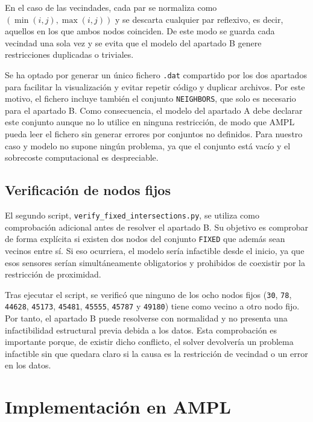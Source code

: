 \documentclass[12pt,a4paper]{article}
\begin{document}
En el caso de las vecindades, cada par se normaliza como \((\min(i,j), \max(i,j))\) y se descarta cualquier par reflexivo, es decir, aquellos en los que ambos nodos coinciden. De este modo se guarda cada vecindad una sola vez y se evita que el modelo del apartado B genere restricciones duplicadas o triviales.

Se ha optado por generar un único fichero \texttt{.dat} compartido por los dos apartados para facilitar la visualización y evitar repetir código y duplicar archivos. Por este motivo, el fichero incluye también el conjunto \texttt{NEIGHBORS}, que solo es necesario para el apartado B. Como consecuencia, el modelo del apartado A debe declarar este conjunto aunque no lo utilice en ninguna restricción, de modo que AMPL pueda leer el fichero sin generar errores por conjuntos no definidos. Para nuestro caso y modelo no supone ningún problema, ya que el conjunto está vacío y el sobrecoste computacional es despreciable.



\subsection{Verificación de nodos fijos}

El segundo script, \texttt{verify\_fixed\_intersections.py}, se utiliza como comprobación adicional antes de resolver el apartado B. Su objetivo es comprobar de forma explícita si existen dos nodos del conjunto \texttt{FIXED} que además sean vecinos entre sí. Si eso ocurriera, el modelo sería infactible desde el inicio, ya que esos sensores serían simultáneamente obligatorios y prohibidos de coexistir por la restricción de proximidad.

Tras ejecutar el script, se verificó que ninguno de los ocho nodos fijos (\texttt{30}, \texttt{78}, \texttt{44628}, \texttt{45173}, \texttt{45481}, \texttt{45555}, \texttt{45787} y \texttt{49180}) tiene como vecino a otro nodo fijo. Por tanto, el apartado B puede resolverse con normalidad y no presenta una infactibilidad estructural previa debida a los datos. Esta comprobación es importante porque, de existir dicho conflicto, el solver devolvería un problema infactible sin que quedara claro si la causa es la restricción de vecindad o un error en los datos.


\section{Implementación en AMPL}
\end{document}
